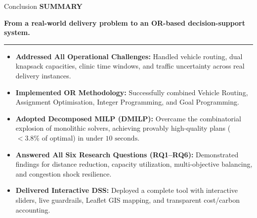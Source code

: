 \documentclass[aspectratio=169,10pt]{beamer}
\newcommand{\sectiontag}[1]{%
    {\scriptsize\bfseries\color{Accent}\MakeUppercase{#1}}\par\vspace{0.08cm}
}
\begin{document}
\begin{frame}{Conclusion}
\sectiontag{Summary}


\vspace{-0.1cm}

\begin{center}
{\normalsize\bfseries\color{Primary}
From a real-world delivery problem to an OR-based decision-support system.
}
\end{center}

\vspace{0.05cm}
\textcolor{Line}{\rule{\linewidth}{0.6pt}}
\vspace{0.15cm}

\begin{itemize}
    \setlength{\itemsep}{3.5pt}
    \footnotesize
    \item \textbf{Addressed All Operational Challenges:} Handled vehicle routing, dual knapsack capacities, clinic time windows, and traffic uncertainty across real delivery instances.
    \item \textbf{Implemented OR Methodology:} Successfully combined Vehicle Routing, Assignment Optimisation, Integer Programming, and Goal Programming.
    \item \textbf{Adopted Decomposed MILP (DMILP):} Overcame the combinatorial explosion of monolithic solvers, achieving provably high-quality plans ($<3.8\%$ of optimal) in under $10\text{ seconds}$.
    \item \textbf{Answered All Six Research Questions (RQ1--RQ6):} Demonstrated findings for distance reduction, capacity utilization, multi-objective balancing, and congestion shock resilience.
    \item \textbf{Delivered Interactive DSS:} Deployed a complete tool with interactive sliders, live guardrails, Leaflet GIS mapping, and transparent cost/carbon accounting.
\end{itemize}

\vfill
\end{frame}

\end{document}
